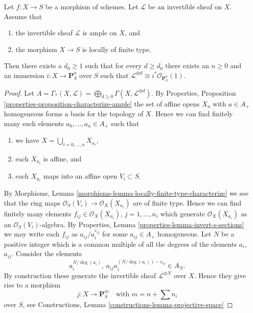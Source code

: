 \begin{lemma}
\label{lemma-quasi-projective-finite-type-over-S}
Let $f : X \to S$ be a morphism of schemes.
Let $\mathcal{L}$ be an invertible sheaf on $X$.
Assume that
\begin{enumerate}
\item the invertible sheaf $\mathcal{L}$ is ample on $X$, and
\item the morphism $X \to S$ is locally of finite type.
\end{enumerate}
Then there exists a $d_0 \geq 1$ such that for every $d \geq d_0$
there exists an $n \geq 0$ and an immersion
$i : X \to \mathbf{P}^n_S$ over $S$ such that
$\mathcal{L}^{\otimes d} \cong i^*\mathcal{O}_{\mathbf{P}^n_S}(1)$.
\end{lemma}

\begin{proof}
Let
$A = \Gamma_*(X, \mathcal{L}) =
\bigoplus_{d \geq 0} \Gamma(X, \mathcal{L}^{\otimes d})$.
By Properties, Proposition \ref{properties-proposition-characterize-ample}
the set of affine opens $X_a$ with $a \in A_{+}$ homogeneous forms
a basis for the topology of $X$. Hence we can find finitely
many such elements $a_0, \ldots, a_n \in A_{+}$ such that
\begin{enumerate}
\item we have $X = \bigcup_{i = 0, \ldots, n} X_{a_i}$,
\item each $X_{a_i}$ is affine, and
\item each $X_{a_i}$ maps into an affine open $V_i \subset S$.
\end{enumerate}
By Morphisms, Lemma \ref{morphisms-lemma-locally-finite-type-characterize}
we see that the ring maps
$\mathcal{O}_S(V_i) \to \mathcal{O}_X(X_{a_i})$ are
of finite type. Hence we can find finitely many
elements $f_{ij} \in \mathcal{O}_X(X_{a_i})$, $j = 1, \ldots, n_i$
which generate $\mathcal{O}_X(X_{a_i})$ as an $\mathcal{O}_S(V_i)$-algebra.
By Properties, Lemma \ref{properties-lemma-invert-s-sections}
we may write each
$f_{ij}$ as $a_{ij}/a_i^{e_{ij}}$ for some
$a_{ij} \in A_{+}$ homogeneous. Let $N$ be a positive integer which
is a common multiple of all the degrees of the elements
$a_i$, $a_{ij}$. Consider the elements
$$
a_i^{N/\deg(a_i)}, \ a_{ij}a_i^{(N/\deg(a_i)) - e_{ij}} \in A_N.
$$
By construction these generate the invertible sheaf
$\mathcal{L}^{\otimes N}$ over $X$. Hence they give rise
to a morphism
$$
j : X \longrightarrow
\mathbf{P}_S^{m}
\quad
\text{with } m = n + \sum n_i
$$
over $S$, see Constructions, Lemma \ref{constructions-lemma-projective-space}

\end{proof}
